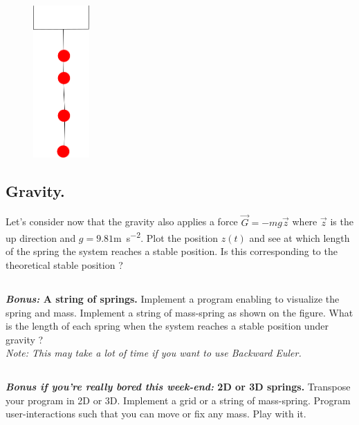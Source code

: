 \begin{figure}
  \centering
  \vspace{-0.5cm}
\includegraphics[width=0.19\textwidth]{springs.png}
\vspace{-1cm}
\end{figure}


\subsection{Gravity.} Let's consider now that the gravity also applies a force $\vec{G} = - m g \vec{z}$ where $\vec{z}$ is the up direction and $g = 9.81$\si{m.s^{-2}}. Plot the position $z(t)$ and see at which length of the spring the system reaches a stable position. Is this corresponding to the theoretical stable position ?

\subsection{} \textbf{\emph{Bonus:} A string of springs.} Implement a program enabling to visualize the spring and mass. Implement a string of mass-spring as shown on the figure. What is the length of each spring when the system reaches a stable position under gravity ?\\
\emph{Note: This may take a lot of time if you want to use Backward Euler.}
%

\subsection{} \textbf{\emph{Bonus if you're really bored this week-end:} 2D or 3D springs.} Transpose your program in 2D or 3D. Implement a grid or a string of mass-spring. Program user-interactions such that you can move or fix any mass. Play with it.
